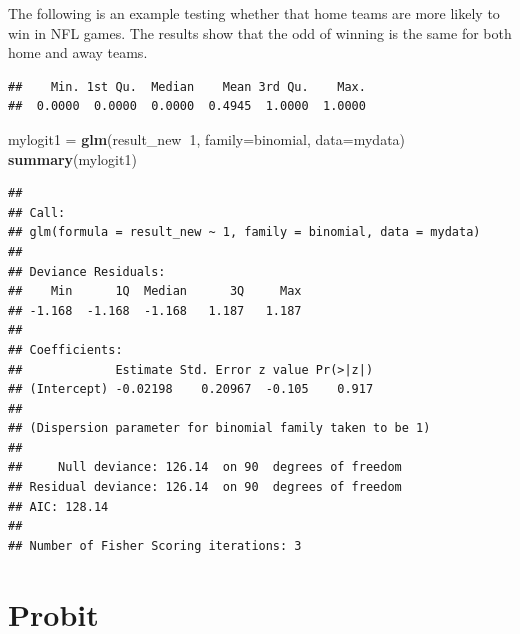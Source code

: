 \documentclass[
]{book}
\newenvironment{Shaded}{\begin{snugshade}}{\end{snugshade}}
\newcommand{\DataTypeTok}[1]{\textcolor[rgb]{0.13,0.29,0.53}{#1}}
\newcommand{\DecValTok}[1]{\textcolor[rgb]{0.00,0.00,0.81}{#1}}
\newcommand{\KeywordTok}[1]{\textcolor[rgb]{0.13,0.29,0.53}{\textbf{#1}}}
\newcommand{\NormalTok}[1]{#1}
\newcommand{\OperatorTok}[1]{\textcolor[rgb]{0.81,0.36,0.00}{\textbf{#1}}}
\newcommand{\StringTok}[1]{\textcolor[rgb]{0.31,0.60,0.02}{#1}}
\begin{document}
The following is an example testing whether that home teams are more likely to win in NFL games. The results show that the odd of winning is the same for both home and away teams.

\begin{Shaded}
\end{Shaded}

\begin{verbatim}
##    Min. 1st Qu.  Median    Mean 3rd Qu.    Max. 
##  0.0000  0.0000  0.0000  0.4945  1.0000  1.0000
\end{verbatim}

\begin{Shaded}
\begin{Highlighting}[]
\NormalTok{mylogit1 =}\StringTok{ }\KeywordTok{glm}\NormalTok{(result_new}\OperatorTok{~}\DecValTok{1}\NormalTok{, }\DataTypeTok{family=}\NormalTok{binomial, }\DataTypeTok{data=}\NormalTok{mydata)}
\KeywordTok{summary}\NormalTok{(mylogit1)}
\end{Highlighting}
\end{Shaded}

\begin{verbatim}
## 
## Call:
## glm(formula = result_new ~ 1, family = binomial, data = mydata)
## 
## Deviance Residuals: 
##    Min      1Q  Median      3Q     Max  
## -1.168  -1.168  -1.168   1.187   1.187  
## 
## Coefficients:
##             Estimate Std. Error z value Pr(>|z|)
## (Intercept) -0.02198    0.20967  -0.105    0.917
## 
## (Dispersion parameter for binomial family taken to be 1)
## 
##     Null deviance: 126.14  on 90  degrees of freedom
## Residual deviance: 126.14  on 90  degrees of freedom
## AIC: 128.14
## 
## Number of Fisher Scoring iterations: 3
\end{verbatim}

\hypertarget{probit}{%
\section{Probit}\label{probit}}
\end{document}
